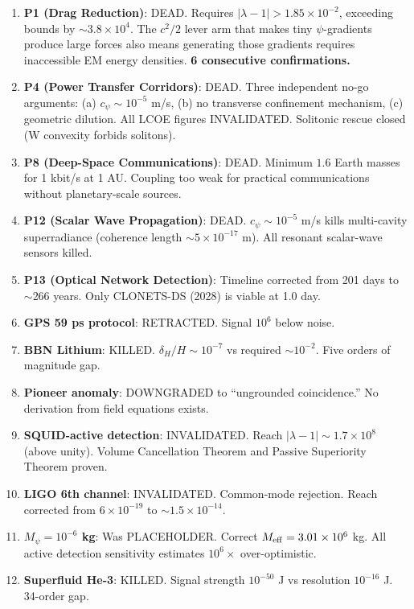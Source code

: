 \documentclass[11pt,a4paper]{article}
\begin{document}
\begin{enumerate}
\item \textbf{P1 (Drag Reduction)}: DEAD. Requires $|\lambda-1| > 1.85 \times 10^{-2}$, exceeding bounds by $\sim 3.8 \times 10^4$. The $c^2/2$ lever arm that makes tiny $\psi$-gradients produce large forces also means generating those gradients requires inaccessible EM energy densities. \textbf{6 consecutive confirmations.}

\item \textbf{P4 (Power Transfer Corridors)}: DEAD. Three independent no-go arguments: (a) $c_\psi \sim 10^{-5}$ m/s, (b) no transverse confinement mechanism, (c) geometric dilution. All LCOE figures INVALIDATED. Solitonic rescue closed (W convexity forbids solitons).

\item \textbf{P8 (Deep-Space Communications)}: DEAD. Minimum $1.6$ Earth masses for 1 kbit/s at 1 AU. Coupling too weak for practical communications without planetary-scale sources.

\item \textbf{P12 (Scalar Wave Propagation)}: DEAD. $c_\psi \sim 10^{-5}$ m/s kills multi-cavity superradiance (coherence length $\sim 5 \times 10^{-17}$ m). All resonant scalar-wave sensors killed.

\item \textbf{P13 (Optical Network Detection)}: Timeline corrected from 201 days to $\sim$266 years. Only CLONETS-DS (2028) is viable at 1.0 day.

\item \textbf{GPS 59 ps protocol}: RETRACTED. Signal $10^6$ below noise.

\item \textbf{BBN Lithium}: KILLED. $\delta_H/H \sim 10^{-7}$ vs required $\sim 10^{-2}$. Five orders of magnitude gap.

\item \textbf{Pioneer anomaly}: DOWNGRADED to ``ungrounded coincidence.'' No derivation from field equations exists.

\item \textbf{SQUID-active detection}: INVALIDATED. Reach $|\lambda-1| \sim 1.7 \times 10^8$ (above unity). Volume Cancellation Theorem and Passive Superiority Theorem proven.

\item \textbf{LIGO 6th channel}: INVALIDATED. Common-mode rejection. Reach corrected from $6 \times 10^{-19}$ to $\sim 1.5 \times 10^{-14}$.

\item \textbf{$M_\psi = 10^{-6}$ kg}: Was PLACEHOLDER. Correct $M_{\rm eff} = 3.01 \times 10^6$ kg. All active detection sensitivity estimates $10^6\times$ over-optimistic.

\item \textbf{Superfluid He-3}: KILLED. Signal strength $10^{-50}$ J vs resolution $10^{-16}$ J. 34-order gap.
\end{enumerate}
\end{document}
